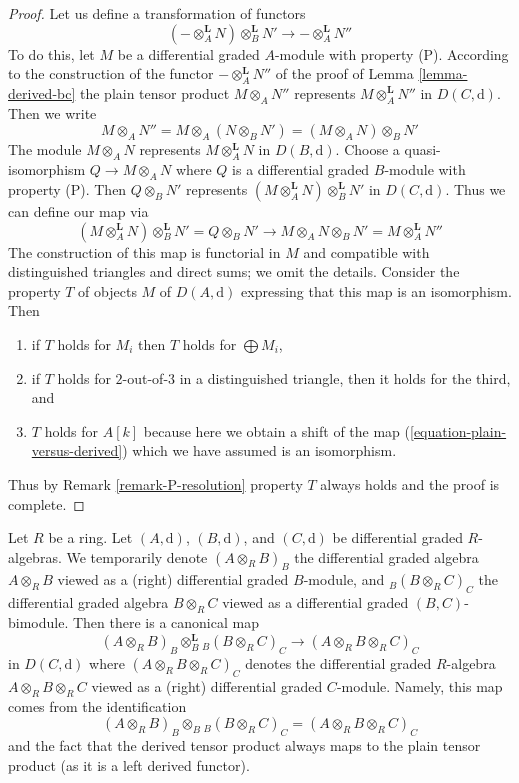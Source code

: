 \begin{proof}
Let us define a transformation of functors
$$
(- \otimes_A^\mathbf{L} N) \otimes_B^\mathbf{L} N'
\longrightarrow
- \otimes_A^\mathbf{L} N''
$$
To do this, let
$M$ be a differential graded $A$-module with property (P).
According to the construction of the functor $- \otimes_A^\mathbf{L} N''$
of the proof of Lemma \ref{lemma-derived-bc} the plain tensor
product $M \otimes_A N''$ represents $M \otimes_A^\mathbf{L} N''$
in $D(C, \text{d})$. Then we write
$$
M \otimes_A N'' =
M \otimes_A (N \otimes_B N') =
(M \otimes_A N) \otimes_B N'
$$
The module $M \otimes_A N$ represents $M \otimes_A^\mathbf{L} N$
in $D(B, \text{d})$. Choose a quasi-isomorphism $Q \to M \otimes_A N$
where $Q$ is a differential graded $B$-module with property (P). Then
$Q \otimes_B N'$ represents
$(M \otimes_A^\mathbf{L} N) \otimes_B^\mathbf{L} N'$ in
$D(C, \text{d})$.
Thus we can define our map via
$$
(M \otimes_A^\mathbf{L} N) \otimes_B^\mathbf{L} N' =
Q \otimes_B N' \to
M \otimes_A N \otimes_B N' =
M \otimes_A^\mathbf{L} N''
$$
The construction of this map is functorial in $M$ and compatible
with distinguished triangles and direct sums; we omit the details.
Consider the property $T$ of objects $M$ of $D(A, \text{d})$ 
expressing that this map is an isomorphism. Then
\begin{enumerate}
\item if $T$ holds for $M_i$ then $T$ holds for $\bigoplus M_i$,
\item if $T$ holds for $2$-out-of-$3$ in a distinguished
triangle, then it holds for the third, and
\item $T$ holds for $A[k]$ because here we obtain a shift
of the map (\ref{equation-plain-versus-derived}) which we
have assumed is an isomorphism.
\end{enumerate}
Thus by Remark \ref{remark-P-resolution} property $T$
always holds and the proof is complete.
\end{proof}

\noindent
Let $R$ be a ring. Let $(A, \text{d})$, $(B, \text{d})$, and
$(C, \text{d})$ be differential graded $R$-algebras.
We temporarily denote $(A \otimes_R B)_B$ the differential
graded algebra $A \otimes_R B$ viewed as a (right) differential
graded $B$-module, and ${}_B(B \otimes_R C)_C$ the differential
graded algebra $B \otimes_R C$ viewed as a differential graded
$(B, C)$-bimodule. Then there is a canonical map
\begin{equation}
\label{equation-plain-versus-derived-algebras}
(A \otimes_R B)_B \otimes_B^\mathbf{L} {}_B(B \otimes_R C)_C
\longrightarrow
(A \otimes_R B \otimes_R C)_C
\end{equation}
in $D(C, \text{d})$ where $(A \otimes_R B \otimes_R C)_C$
denotes the differential
graded $R$-algebra $A \otimes_R B \otimes_R C$ viewed as a
(right) differential graded $C$-module. Namely, this map
comes from the identification
$$
(A \otimes_R B)_B \otimes_B {}_B(B \otimes_R C)_C =
(A \otimes_R B \otimes_R C)_C
$$
and the fact that the derived tensor product always maps to the
plain tensor product (as it is a left derived functor).

